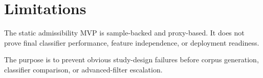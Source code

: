 \section{Limitations}

The static admissibility MVP is sample-backed and proxy-based. It does not prove final classifier performance, feature independence, or deployment readiness.

The purpose is to prevent obvious study-design failures before corpus generation, classifier comparison, or advanced-filter escalation.

